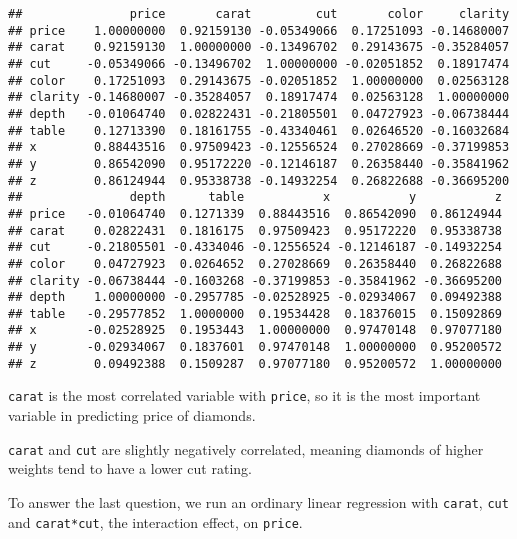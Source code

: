 \documentclass[]{article}
\newenvironment{Shaded}{\begin{snugshade}}{\end{snugshade}}
\newcommand{\KeywordTok}[1]{\textcolor[rgb]{0.13,0.29,0.53}{\textbf{#1}}}
\newcommand{\DataTypeTok}[1]{\textcolor[rgb]{0.13,0.29,0.53}{#1}}
\newcommand{\StringTok}[1]{\textcolor[rgb]{0.31,0.60,0.02}{#1}}
\newcommand{\OperatorTok}[1]{\textcolor[rgb]{0.81,0.36,0.00}{\textbf{#1}}}
\newcommand{\NormalTok}[1]{#1}
\theoremstyle{definition}
\theoremstyle{definition}
\theoremstyle{definition}
\theoremstyle{remark}
\begin{document}
\begin{verbatim}
##               price       carat         cut       color     clarity
## price    1.00000000  0.92159130 -0.05349066  0.17251093 -0.14680007
## carat    0.92159130  1.00000000 -0.13496702  0.29143675 -0.35284057
## cut     -0.05349066 -0.13496702  1.00000000 -0.02051852  0.18917474
## color    0.17251093  0.29143675 -0.02051852  1.00000000  0.02563128
## clarity -0.14680007 -0.35284057  0.18917474  0.02563128  1.00000000
## depth   -0.01064740  0.02822431 -0.21805501  0.04727923 -0.06738444
## table    0.12713390  0.18161755 -0.43340461  0.02646520 -0.16032684
## x        0.88443516  0.97509423 -0.12556524  0.27028669 -0.37199853
## y        0.86542090  0.95172220 -0.12146187  0.26358440 -0.35841962
## z        0.86124944  0.95338738 -0.14932254  0.26822688 -0.36695200
##               depth      table           x           y           z
## price   -0.01064740  0.1271339  0.88443516  0.86542090  0.86124944
## carat    0.02822431  0.1816175  0.97509423  0.95172220  0.95338738
## cut     -0.21805501 -0.4334046 -0.12556524 -0.12146187 -0.14932254
## color    0.04727923  0.0264652  0.27028669  0.26358440  0.26822688
## clarity -0.06738444 -0.1603268 -0.37199853 -0.35841962 -0.36695200
## depth    1.00000000 -0.2957785 -0.02528925 -0.02934067  0.09492388
## table   -0.29577852  1.0000000  0.19534428  0.18376015  0.15092869
## x       -0.02528925  0.1953443  1.00000000  0.97470148  0.97077180
## y       -0.02934067  0.1837601  0.97470148  1.00000000  0.95200572
## z        0.09492388  0.1509287  0.97077180  0.95200572  1.00000000
\end{verbatim}

\texttt{carat} is the most correlated variable with \texttt{price}, so
it is the most important variable in predicting price of diamonds.

\texttt{carat} and \texttt{cut} are slightly negatively correlated,
meaning diamonds of higher weights tend to have a lower cut rating.

To answer the last question, we run an ordinary linear regression with
\texttt{carat}, \texttt{cut} and \texttt{carat*cut}, the interaction
effect, on \texttt{price}.

\begin{Shaded}
\end{Shaded}
\end{document}
